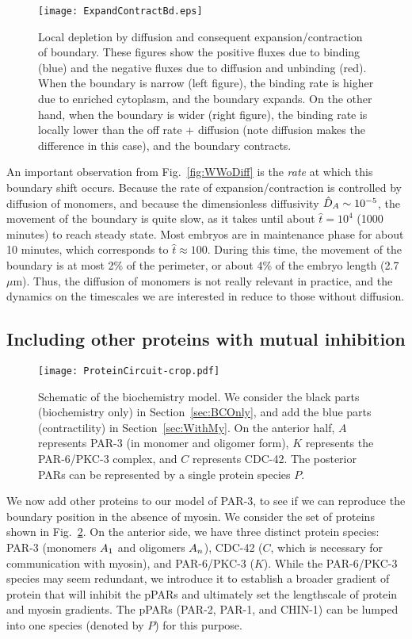 \documentclass[11pt]{article}
\newcommand{\6}[1]{#1_{\text{6}}}
\newcommand{\3}[1]{#1_{\text{3}}}
\begin{document}
\begin{figure}
\centering
\texttt{[image: ExpandContractBd.eps]}
\caption{\label{fig:ExpContrBd}Local depletion by diffusion and consequent expansion/contraction of boundary. These figures show the positive fluxes due to binding (blue) and the negative fluxes due to diffusion and unbinding (red). When the boundary is narrow (left figure), the binding rate is higher due to enriched cytoplasm, and the boundary expands. On the other hand, when the boundary is wider (right figure), the binding rate is locally lower than the off rate + diffusion (note diffusion makes the difference in this case), and the boundary contracts. }
\end{figure}

An important observation from Fig.\ \ref{fig:WWoDiff} is the \emph{rate} at which this boundary shift occurs. Because the rate of expansion/contraction is controlled by diffusion of monomers, and because the dimensionless diffusivity $\hat{D}_A \sim 10^{-5}$,  the movement of the boundary is quite slow, as it takes until about $\hat t = 10^4$ (1000 minutes) to reach steady state. Most embryos are in maintenance phase for about 10 minutes, which corresponds to $\hat t \approx 100$. During this time, the movement of the boundary is at most 2\% of the perimeter, or about 4\% of the embryo length (2.7 $\mu$m). Thus, the diffusion of monomers is not really relevant in practice, and the dynamics on the timescales we are interested in reduce to those without diffusion.


\subsection{Including other proteins with mutual inhibition \label{sec:BCOnly}}
\begin{figure}
\centering
\texttt{[image: ProteinCircuit-crop.pdf]}
\caption{\label{fig:ModelSch}Schematic of the biochemistry model. We consider the black parts (biochemistry only) in Section\ \ref{sec:BCOnly}, and add the blue parts (contractility) in Section\ \ref{sec:WithMy}. On the anterior half, $A$ represents PAR-3 (in monomer and oligomer form), $K$ represents the PAR-6/PKC-3 complex, and $C$ represents CDC-42. The posterior PARs can be represented by a single protein species $P$.}
\end{figure}

We now add other proteins to our model of PAR-3, to see if we can reproduce the boundary position in the absence of myosin. We consider the set of proteins shown in Fig.\ \ref{fig:ModelSch}. On the anterior side, we have three distinct protein species: PAR-3 (monomers $A_1$ and oligomers $A_n$), CDC-42 ($C$, which is necessary for communication with myosin), and PAR-6/PKC-3 ($K$). While the PAR-6/PKC-3 species may seem redundant, we introduce it to establish a broader gradient of protein that will inhibit the pPARs and ultimately set the lengthscale of protein and myosin gradients. The pPARs (PAR-2, PAR-1, and CHIN-1) can be lumped into one species (denoted by $P$) for this purpose.
\end{document}
